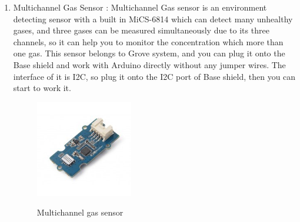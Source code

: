 \begin{enumerate}
	\item Multichannel Gas Sensor : Multichannel Gas sensor is an environment detecting sensor with a built in MiCS-6814 which can detect many unhealthy gases, and three gases can be measured simultaneously due to its three channels, so it can help you to monitor the concentration which more than one gas.  This sensor belongs to Grove system, and you can plug it onto the Base shield and work with Arduino directly without any jumper wires. The interface of it is I2C, so plug it onto the I2C port of Base shield, then you can start to work it.

\begin{figure}[h]
	\centering
	\includegraphics[width=0.4\textwidth]{./multi}\\[0.1in]
	\label{fig:Multichannel gas sensor}
	\caption{Multichannel gas sensor}
	\end{figure}



\end{enumerate}

